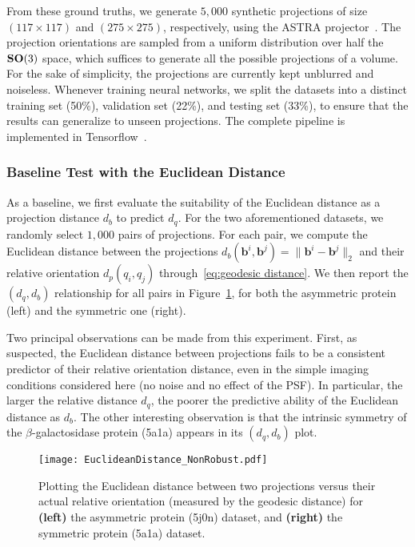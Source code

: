From these ground truths, we generate $5,000$ synthetic projections of size $(117\times 117)$ and $(275\times 275)$, respectively, using the ASTRA projector~\cite{van2015astra}. The projection orientations are sampled from a uniform distribution over half the $\mathrm{\mathbf{SO}}(3)$ space, which suffices to generate all the possible projections of a volume. For the sake of simplicity, the projections are currently kept unblurred and noiseless. Whenever training neural networks, we split the datasets into a distinct training set (50\%), validation set (22\%), and testing set (33\%), to ensure that the results can generalize to unseen projections. The complete pipeline is implemented in Tensorflow~\cite{abadi2016tensorflow}.

\subsubsection{Baseline Test with the Euclidean Distance}

As a baseline, we first evaluate the suitability of the Euclidean distance as a projection distance $d_b$ to predict $d_q$. For the two aforementioned datasets, we randomly select $1,000$ pairs of projections. For each pair, we compute the Euclidean distance between the projections $d_b(\mathbf{b}^i,\mathbf{b}^j)=\lVert\mathbf{b}^i-\mathbf{b}^j\rVert_2$ and their relative orientation $d_p(q_i,q_j)$ through~\eqref{eq:geodesic distance}. We then report the $(d_q,d_b)$ relationship for all pairs in Figure~\ref{fig:euclidean-not-robust}, for both the asymmetric protein (left) and the symmetric one (right).

Two principal observations can be made from this experiment. First, as suspected, the Euclidean distance between projections fails to be a consistent predictor of their relative orientation distance, even in the simple imaging conditions considered here (no noise and no effect of the PSF). In particular, the larger the relative distance $d_q$, the poorer the predictive ability of the Euclidean distance as $d_b$. The other interesting observation is that the intrinsic symmetry of the $\beta$-galactosidase protein (5a1a) appears in its $(d_q,d_b)$ plot.

\begin{figure}[t]
    \centering
    \texttt{[image: EuclideanDistance\_NonRobust.pdf]}
    \caption{Plotting the Euclidean distance between two projections versus their actual relative orientation (measured by the geodesic distance) for \textbf{(left)} the asymmetric protein (5j0n) dataset, and \textbf{(right)} the symmetric protein (5a1a) dataset. }
    \label{fig:euclidean-not-robust}
\end{figure}

